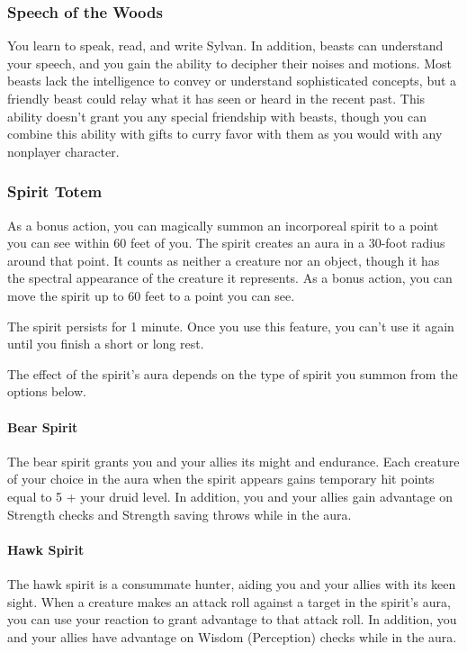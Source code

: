 \documentclass[letterpaper,openany,oneside,twocolumn]{book}
\begin{document}
\subsubsection*{Speech of the Woods}
You learn to speak, read, and write Sylvan. In addition, beasts can understand your speech, and you gain the ability to decipher their noises and motions. Most beasts lack the intelligence to convey or understand sophisticated concepts, but a friendly beast could relay what it has seen or heard in the recent past. This ability doesn't grant you any special friendship with beasts, though you can combine this ability with gifts to curry favor with them as you would with any nonplayer character.
\subsubsection*{Spirit Totem}
As a bonus action, you can magically summon an incorporeal spirit to a point you can see within 60 feet of you. The spirit creates an aura in a 30-foot radius around that point. It counts as neither a creature nor an object, though it has the spectral appearance of the creature it represents. As a bonus action, you can move the spirit up to 60 feet to a point you can see.

The spirit persists for 1 minute. Once you use this feature, you can't use it again until you finish a short or long rest.

The effect of the spirit's aura depends on the type of spirit you summon from the options below.

\paragraph*{Bear Spirit} The bear spirit grants you and your allies its might and endurance. Each creature of your choice in the aura when the spirit appears gains temporary hit points equal to 5 + your druid level. In addition, you and your allies gain advantage on Strength checks and Strength saving throws while in the aura.

\paragraph*{Hawk Spirit} The hawk spirit is a consummate hunter, aiding you and your allies with its keen sight. When a creature makes an attack roll against a target in the spirit's aura, you can use your reaction to grant advantage to that attack roll. In addition, you and your allies have advantage on Wisdom (Perception) checks while in the aura.
\end{document}
